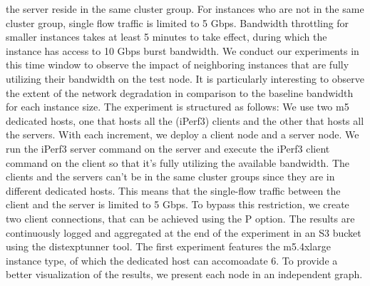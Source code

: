 the server reside in the same cluster group. For instances who are not in the same cluster group, single flow 
traffic is limited to 5 Gbps. 
Bandwidth throttling for smaller instances takes at least 5 minutes to take effect, during which the instance
has access to 10 Gbps burst bandwidth. We conduct our experiments in this time window to observe the impact 
of neighboring instances that are fully utilizing their bandwidth on the test node. It is particularly 
interesting to observe the extent of the network degradation in comparison to the baseline bandwidth 
for each instance size. The experiment is structured as follows: We use two m5 dedicated hosts, one 
that hosts all the (iPerf3) clients and the other that hosts all the servers. With each increment, we deploy a 
client node and a server node. We run the iPerf3 server command on the server and execute the iPerf3 client 
command on the client so that it's fully utilizing the available bandwidth. The clients and the servers 
can't be in the same cluster groups since they are in different dedicated hosts. This means that the 
single-flow traffic between the client and the server is limited to 5 Gbps. To bypass this restriction, 
we create two client connections, that can be achieved using the P option. The results are continuously logged 
and aggregated at the end of the experiment in an S3 bucket using the distexptunner tool. The first experiment 
features the m5.4xlarge instance type, of which the dedicated host can accomoadate 6. To provide a better 
visualization of the results, we present each node in an independent graph. 

